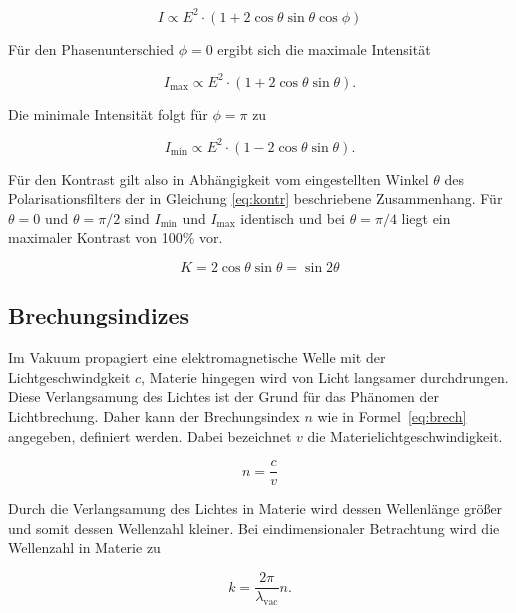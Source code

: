 \begin{equation}
I \propto E^2\cdot(1 + 2\cos \theta \sin \theta \cos \phi)
\label{eq:kontrastwinkel}
\end{equation}

Für den Phasenunterschied $\phi = 0$ ergibt sich die maximale Intensität

\begin{equation}
I_\text{max} \propto E^2\cdot(1 + 2\cos \theta \sin \theta).
\label{eq:intens_max}
\end{equation}

Die minimale Intensität folgt für $\phi = \pi$ zu

\begin{equation}
I_\text{min} \propto E^2\cdot(1 - 2\cos \theta \sin \theta).
\label{eq:intens_min}
\end{equation}

Für den Kontrast gilt also in Abhängigkeit vom eingestellten Winkel $\theta$ des Polarisationsfilters der in Gleichung \eqref{eq:kontr} beschriebene Zusammenhang. Für $\theta = 0$ und $\theta = \pi/2$ sind $I_\text{min}$ und $I_\text{max}$ identisch und bei $\theta = \pi/4$ liegt ein maximaler Kontrast von 100\% vor.

\begin{equation}
	K = 2 \cos \theta \sin \theta = \sin 2\theta
	\label{eq:kontr}
\end{equation}


\subsection{Brechungsindizes}
Im Vakuum propagiert eine elektromagnetische Welle mit der Lichtgeschwindgkeit $c$, Materie hingegen wird von Licht langsamer durchdrungen. Diese Verlangsamung des Lichtes ist der Grund für das Phänomen der Lichtbrechung. Daher kann der Brechungsindex $n$ wie in Formel~\eqref{eq:brech} angegeben, definiert werden. Dabei bezeichnet $v$ die Materielichtgeschwindigkeit.

\begin{equation}
n = \frac{c}{v}
\label{eq:brech}
\end{equation}

Durch die Verlangsamung des Lichtes in Materie wird dessen Wellenlänge größer und somit dessen Wellenzahl kleiner. Bei eindimensionaler Betrachtung wird die Wellenzahl in Materie zu

\begin{equation*}
k = \frac{2\pi}{\lambda_\text{vac}}n.
\end{equation*}


